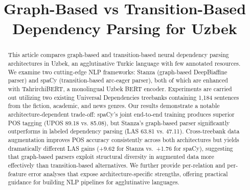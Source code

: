 \documentclass[10pt,conference,a4paper]{IEEEtran_EDM}
\def\confheader{}
\begin{document}
\markboth{\confheader}{}
\title{Graph-Based vs Transition-Based Dependency Parsing for Uzbek}


\author{
\and
{}
\and
{}
}

\maketitle

\begin{abstract}
This article compares graph-based and transition-based neural dependency parsing architectures in Uzbek, an agglutinative Turkic language with few annotated resources. We examine two cutting-edge NLP frameworks: Stanza (graph-based DeepBiaffine parser) and spaCy (transition-based arc-eager parser), both of which are enhanced with TahrirchiBERT, a monolingual Uzbek BERT encoder. Experiments are carried out utilizing two existing Universal Dependencies treebanks containing 1,184 sentences from the fiction, academic, and news genres. Our results demonstrate a notable architecture-dependent trade-off: spaCy's joint end-to-end training produces superior POS tagging (UPOS 89.18 vs. 85.08), but Stanza's graph-based parser significantly outperforms in labeled dependency parsing (LAS 63.81 vs. 47.11).  Cross-treebank data augmentation improves POS accuracy consistently across both architectures but yields dramatically different LAS gains (+9.62 for Stanza vs.\ +1.76 for spaCy), suggesting that graph-based parsers exploit structural diversity in augmented data more effectively than transition-based alternatives. We further provide per-relation and per-feature error analyses that expose architecture-specific strengths, offering practical guidance for building NLP pipelines for agglutinative languages.
\end{abstract}
\end{document}
